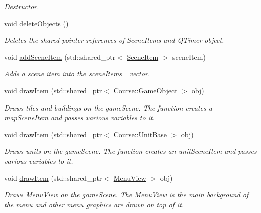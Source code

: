 \begin{DoxyCompactItemize}
\begin{DoxyCompactList}\small\item\em Destructor. \end{DoxyCompactList}\item 
void \hyperlink{class_student_1_1_game_scene_a93a476ffb725f5fa913dff1110221955}{delete\-Objects} ()
\begin{DoxyCompactList}\small\item\em Deletes the shared pointer references of Scene\-Items and Q\-Timer object. \end{DoxyCompactList}\item 
void \hyperlink{class_student_1_1_game_scene_ad2bc91fba43318ee9dd304f2bcca6267}{add\-Scene\-Item} (std\-::shared\-\_\-ptr$<$ \hyperlink{class_student_1_1_scene_item}{Scene\-Item} $>$ scene\-Item)
\begin{DoxyCompactList}\small\item\em Adds a scene item into the scene\-Items\-\_\- vector. \end{DoxyCompactList}\item 
void \hyperlink{class_student_1_1_game_scene_a1ae69029ef6f0c411edda1ab35afe201}{draw\-Item} (std\-::shared\-\_\-ptr$<$ \hyperlink{class_course_1_1_game_object}{Course\-::\-Game\-Object} $>$ obj)
\begin{DoxyCompactList}\small\item\em Draws tiles and buildings on the game\-Scene. The function creates a map\-Scene\-Item and passes various variables to it. \end{DoxyCompactList}\item 
void \hyperlink{class_student_1_1_game_scene_ab6ea04e955749b9dfbe1419e33509815}{draw\-Item} (std\-::shared\-\_\-ptr$<$ \hyperlink{class_course_1_1_unit_base}{Course\-::\-Unit\-Base} $>$ obj)
\begin{DoxyCompactList}\small\item\em Draws units on the game\-Scene. The function creates an unit\-Scene\-Item and passes various variables to it. \end{DoxyCompactList}\item 
void \hyperlink{class_student_1_1_game_scene_a3378a68b76da9b86e21e1a86b1683f76}{draw\-Item} (std\-::shared\-\_\-ptr$<$ \hyperlink{class_student_1_1_menu_view}{Menu\-View} $>$ obj)
\begin{DoxyCompactList}\small\item\em Draws \hyperlink{class_student_1_1_menu_view}{Menu\-View} on the game\-Scene. The \hyperlink{class_student_1_1_menu_view}{Menu\-View} is the main background of the menu and other menu graphics are drawn on top of it. \end{DoxyCompactList}\item 

\end{DoxyCompactItemize}
